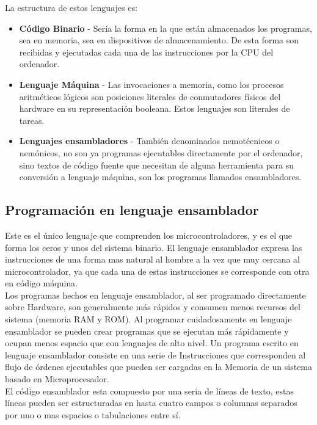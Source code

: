 \documentclass[12pt,a4paper]{article}
\begin{document}
   La estructura de estos lenguajes es:
   \begin{itemize}
   		\item \textbf{Código Binario} - Sería la forma en la que están almacenados los programas, sea en memoria, sea en dispositivos de almacenamiento. De esta forma son recibidas y ejecutadas cada una de las instrucciones por la CPU del ordenador.
   		\item \textbf{Lenguaje Máquina} - Las invocaciones a memoria, como los procesos aritméticos lógicos son posiciones literales de conmutadores físicos del hardware en su representación booleana. Estos lenguajes son literales de tareas.
   		\item \textbf{Lenguajes ensambladores} - También denominados nemotécnicos o nemónicos, no son ya programas ejecutables directamente por el ordenador, sino textos de código fuente que necesitan de alguna herramienta para su conversión a lenguaje máquina, son los programas llamados ensambladores.
   \end{itemize}
   
   \subsection{Programación en lenguaje ensamblador}   
   Este es el único lenguaje que comprenden los microcontroladores, y es el que forma los ceros y unos del sistema binario. El lenguaje ensamblador expresa las instrucciones de una forma mas natural al hombre a la vez que muy cercana al microcontrolador, ya que cada una de estas instrucciones se corresponde con otra en código máquina.\\
   Los programas hechos en lenguaje ensamblador, al ser programado directamente sobre Hardware, son generalmente más rápidos y consumen menos recursos del sistema (memoria RAM y ROM). Al programar cuidadosamente en lenguaje ensamblador se pueden crear programas que se ejecutan más rápidamente y ocupan menos espacio que con lenguajes de alto nivel. Un programa escrito en lenguaje ensamblador consiste en una serie de Instrucciones que corresponden al flujo de órdenes ejecutables que pueden ser cargadas en la Memoria de un sistema basado en Microprocesador. \\
   El código ensamblador esta compuesto por una seria de líneas de texto, estas líneas pueden ser estructuradas en hasta cuatro campos o columnas separados por uno o mas espacios o tabulaciones entre sí.\\
   
\end{document}
